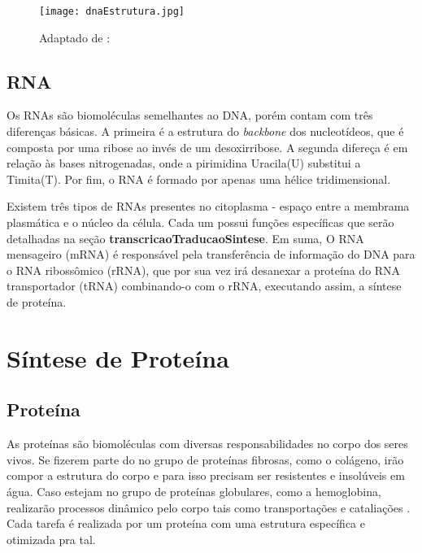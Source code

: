 \begin{figure}[h]
    \centering
    \texttt{[image: dnaEstrutura.jpg]}
    \caption{Adaptado de : \cite{dnadiscovery08} }
    \label{fig:EstruturasDoDNA}
\end{figure} 


\subsection{RNA} \label{aceidosNucleicos:rna}

\indent Os RNAs são biomoléculas semelhantes ao DNA, porém contam com três diferenças básicas. A primeira é a estrutura do \textit{backbone} dos nucleotídeos, que é composta por uma ribose ao invés de um desoxirribose. A segunda difereça é em relação às bases nitrogenadas, onde a pirimidina Uracila(U) substitui a Timita(T). 
Por fim, o RNA é formado por apenas uma hélice tridimensional.

\indent Existem três tipos de RNAs presentes no citoplasma - espaço entre a membrama plasmática e o núcleo da célula. 
Cada um possui funções específicas que serão detalhadas na seção \textbf{transcricaoTraducaoSintese}. Em suma, O RNA mensageiro (mRNA) é responsável pela transferência de informação do DNA para o RNA ribossômico (rRNA), que por sua vez irá desanexar a proteína do RNA transportador (tRNA) combinando-o com o rRNA, executando assim, a síntese de proteína.




\section{Síntese de Proteína} \label{sinteseDeProteina}



\subsection{Proteína} \label{sinteseDeProteina:proteina}

\indent As proteínas são biomoléculas com diversas responsabilidades no corpo dos seres vivos. 
Se fizerem parte do no grupo de proteínas fibrosas, como o colágeno, irão compor a estrutura do corpo e para isso precisam ser resistentes e insolúveis em água. Caso estejam no grupo de proteínas globulares, como a hemoglobina, realizarão processos dinâmico pelo corpo tais como transportações e cataliações \cite{profangela11}.  Cada tarefa é realizada por um proteína com uma estrutura específica e otimizada pra tal.

